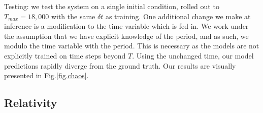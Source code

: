 \documentclass[twoside]{article}
\begin{document}
Testing: we test the system on a single initial condition, rolled out to $T_{max} = 18,000$ with the same $\delta t$ as training. One additional change we make at inference is a modification to the time variable which is fed in. We work under the assumption that we have explicit knowledge of the period, and as such, we modulo the time variable with the period. This is necessary as the models are not explicitly trained on time steps beyond $T$. Using the unchanged time, our model predictions rapidly diverge from the ground truth. Our results are visually presented in Fig.\ref{fig.chaos}.  
\subsection{Relativity}



\begin{table}[ht!]
\caption{Test Rollout MSE} 
\centering %
\label{tab:tests}
\end{table}

\pagebreak


\end{document}
